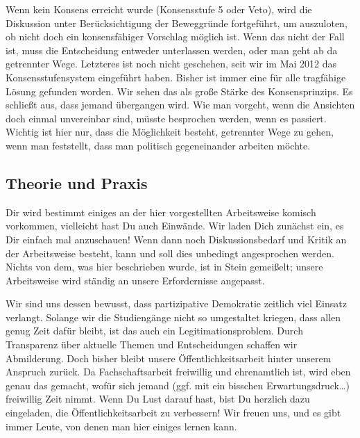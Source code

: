 Wenn kein Konsens erreicht wurde (Konsensstufe 5 oder Veto), wird die Diskussion unter Berücksichtigung der Beweggründe fortgeführt, um auszuloten, ob nicht doch ein konsensfähiger Vorschlag möglich ist. Wenn das nicht der Fall ist, muss die Entscheidung entweder unterlassen werden, oder man geht ab da getrennter Wege. Letzteres ist noch nicht geschehen, seit wir im Mai 2012 das Konsensstufensystem eingeführt haben.
Bisher ist immer eine für alle tragfähige Lösung gefunden worden. Wir sehen das als große Stärke des Konsensprinzips. Es schließt aus, dass jemand übergangen wird. Wie man vorgeht, wenn die Ansichten doch einmal unvereinbar sind, müsste besprochen werden, wenn es passiert. Wichtig ist hier nur, dass die Möglichkeit besteht, getrennter Wege zu gehen, wenn man feststellt, dass man politisch gegeneinander arbeiten möchte.


\begin{figure*}[b]
\noindent{}
\end{figure*}

\subsection{Theorie und Praxis}
Dir wird bestimmt einiges an der hier vorgestellten Arbeitsweise komisch vorkommen, vielleicht hast Du auch Einwände. Wir laden Dich zunächst ein, es Dir einfach mal anzuschauen! Wenn dann noch Diskussionsbedarf und Kritik an der Arbeitsweise besteht, kann und soll dies unbedingt angesprochen werden. Nichts von dem, was hier beschrieben wurde, ist in Stein gemeißelt; unsere Arbeitsweise wird ständig an unsere Erfordernisse angepasst.

Wir sind uns dessen bewusst, dass partizipative Demokratie zeitlich viel Einsatz verlangt. Solange wir die Studiengänge nicht so umgestaltet kriegen, dass allen genug Zeit dafür bleibt, ist das auch ein Legitimationsproblem. Durch Transparenz über aktuelle Themen und Entscheidungen schaffen wir Abmilderung. Doch bisher bleibt unsere Öffentlichkeitsarbeit hinter unserem Anspruch zurück. Da Fachschaftsarbeit freiwillig und ehrenamtlich ist, wird eben genau das gemacht, wofür sich jemand (ggf. mit ein bisschen Erwartungsdruck\dots) freiwillig Zeit nimmt. Wenn Du Lust darauf hast, bist Du herzlich dazu eingeladen, die Öffentlichkeitsarbeit zu verbessern! Wir freuen uns, und es gibt immer Leute, von denen man hier einiges lernen kann.

